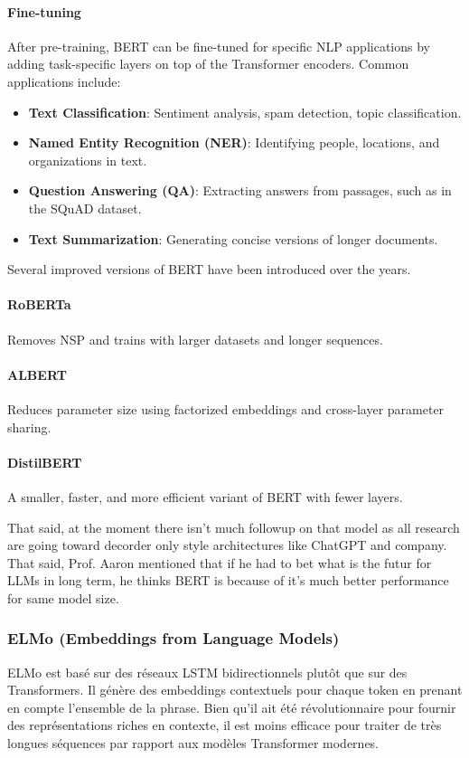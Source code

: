 \documentclass{article}
\begin{document}
\paragraph{Fine-tuning}
After pre-training, BERT can be fine-tuned for specific NLP applications by adding task-specific layers on top of the Transformer encoders. Common applications include:
\begin{itemize}
    \item \textbf{Text Classification}: Sentiment analysis, spam detection, topic classification.
    \item \textbf{Named Entity Recognition (NER)}: Identifying people, locations, and organizations in text.
    \item \textbf{Question Answering (QA)}: Extracting answers from passages, such as in the SQuAD dataset.
    \item \textbf{Text Summarization}: Generating concise versions of longer documents.
\end{itemize}

Several improved versions of BERT have been introduced over the years.

\paragraph{RoBERTa} Removes NSP and trains with larger datasets and longer sequences.

\paragraph{ALBERT} Reduces parameter size using factorized embeddings and cross-layer parameter sharing.

\paragraph{DistilBERT} A smaller, faster, and more efficient variant of BERT with fewer layers.

That said, at the moment there isn't much followup on that model as all research are going toward decorder only style architectures like ChatGPT and company. That said, Prof. Aaron mentioned that if he had to bet what is the futur for LLMs in long term, he thinks BERT is because of it's much better performance for same model size.

\subsubsection{ELMo (Embeddings from Language Models)}
ELMo est basé sur des réseaux LSTM bidirectionnels plutôt que sur des Transformers. Il génère des embeddings contextuels pour chaque token en prenant en compte l'ensemble de la phrase. Bien qu'il ait été révolutionnaire pour fournir des représentations riches en contexte, il est moins efficace pour traiter de très longues séquences par rapport aux modèles Transformer modernes.
\end{document}
